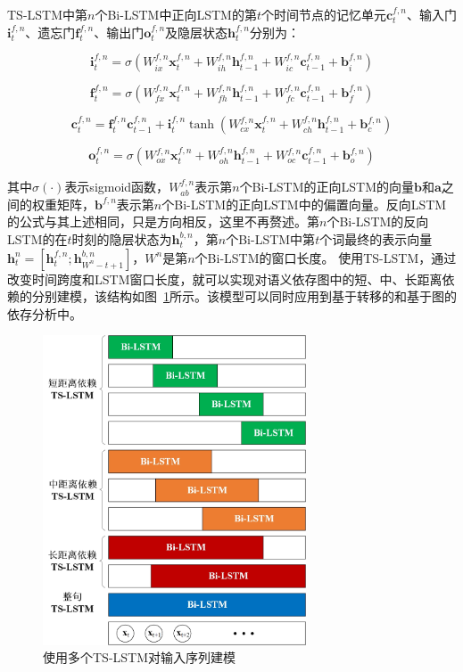 TS-LSTM中第$n$个Bi-LSTM中正向LSTM的第$t$个时间节点的记忆单元$\mathbf{c}^{f,n}_t$、输入门$\mathbf{i}^{f,n}_t$、遗忘门$\mathbf{f}^{f,n}_t$、输出门$\mathbf{o}^{f,n}_t$及隐层状态$\mathbf{h}^{f,n}_t$分别为：

\begin{equation}
\mathbf{i}^{f,n}_t = \sigma(W^{f,n}_{ix} \mathbf{x}^{f,n}_t + W^{f,n}_{ih} \mathbf{h}^{f,n}_{t-1} + W^{f,n}_{ic} \mathbf{c}^{f,n}_{t-1} + \mathbf{b}^{f,n}_i)
\end{equation}

\begin{equation}
\mathbf{f}^{f,n}_t = \sigma(W^{f,n}_{fx} \mathbf{x}^{f,n}_t + W^{f,n}_{fh} \mathbf{h}^{f,n}_{t-1} + W^{f,n}_{fc} \mathbf{c}^{f,n}_{t-1} + \mathbf{b}^{f,n}_f)
\end{equation}

\begin{equation}
\mathbf{c}^{f,n}_t = \mathbf{f}^{f,n}_t \mathbf{c}^{f,n}_{t-1} + \mathbf{i}^{f,n}_t \tanh(W^{f,n}_{cx}\mathbf{x}^{f,n}_t + W^{f,n}_{ch}\mathbf{h}^{f,n}_{t-1} + \mathbf{b}^{f,n}_c)
\end{equation}

\begin{equation}
\mathbf{o}^{f,n}_t = \sigma(W^{f,n}_{ox} \mathbf{x}^{f,n}_t + W^{f,n}_{oh} \mathbf{h}^{f,n}_{t-1} + W^{f,n}_{oc} \mathbf{c}^{f,n}_{t-1} + \mathbf{b}^{f,n}_o)
\end{equation}

其中$\sigma(\cdot)$表示sigmoid函数，$W^{f,n}_{ab}$表示第$n$个Bi-LSTM的正向LSTM的向量$\mathbf{b}$和$\mathbf{a}$之间的权重矩阵，$\mathbf{b}^{f,n}$表示第$n$个Bi-LSTM的正向LSTM中的偏置向量。反向LSTM的公式与其上述相同，只是方向相反，这里不再赘述。第$n$个Bi-LSTM的反向LSTM的在$t$时刻的隐层状态为$\mathbf{h}^{b,n}_t$，第$n$个Bi-LSTM中第$t$个词最终的表示向量$\mathbf{h}^n_t = [\mathbf{h}^{f,n}_t;\mathbf{h}^{b,n}_{W^n-t+1}]$，$W^n$是第$n$个Bi-LSTM的窗口长度。
使用TS-LSTM，通过改变时间跨度和LSTM窗口长度，就可以实现对语义依存图中的短、中、长距离依赖的分别建模，该结构如图~\ref{fig:multi-ts-lstm}所示。该模型可以同时应用到基于转移的和基于图的依存分析中。

\begin{figure}[hbtp]
	\centering
	\includegraphics[width=78mm]{picture/multi-ts-lstm.jpg}
	\caption{使用多个TS-LSTM对输入序列建模}
	\label{fig:multi-ts-lstm}
\end{figure}

